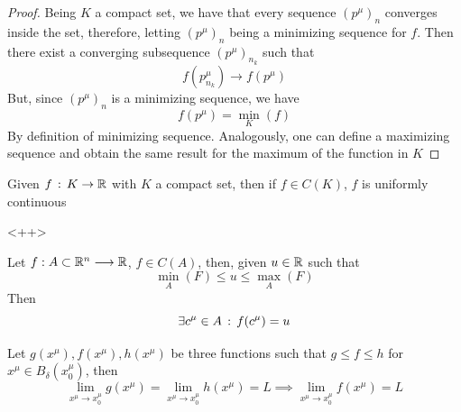 \documentclass[../complete.tex]{subfiles}
\begin{document}
\begin{proof}
	Being $K$ a compact set, we have that every sequence $(p^\mu)_n$ converges inside the set, therefore, letting $(p^\mu)_n$ being a minimizing sequence for $f$. Then there exist a converging subsequence $(p^\mu)_{n_k}$ such that
	\begin{equation*}
		f(p^\mu_{n_k})\to f(p^\mu)
	\end{equation*}
	But, since $(p^\mu)_n$ is a minimizing sequence, we have
	\begin{equation*}
		f(p^\mu)=\min_{K}(f)
	\end{equation*}
	By definition of minimizing sequence. Analogously, one can define a maximizing sequence and obtain the same result for the maximum of the function in $K$
\end{proof}
\begin{thm}
	Given $f\, :\,  K\to\mathbb{R}$ with $K$ a compact set, then if $f\in C(K)$, $f$ is uniformly continuous
\end{thm}<++>
\begin{thm}
	Let $f:A\subset\mathbb{R}^n\overset{}{\longrightarrow}\mathbb{R}$, $f\in C(A)$, then, given $u\in\mathbb{R}$ such that
	\begin{equation*}
		\min_A(F)\le u\le\max_A(F)
	\end{equation*}
	Then
	\begin{equation*}
		\exists c^\mu\in A\, :\,  f(c^\mu)=u
	\end{equation*}
\end{thm}
\begin{thm}[Squeeze]
	Let $g(x^\mu),f(x^\mu),h(x^\mu)$ be three functions such that $g\le f\le h$ for $x^\mu\in B_\delta(x^\mu_0)$, then
	\begin{equation*}
		\lim_{x^\mu\to x_0^\mu}g(x^\mu)=\lim_{x^\mu\to x_0^\mu}h(x^\mu)=L\implies{}\lim_{x^\mu\to x_0^\mu}f(x^\mu)=L
	\end{equation*}
\end{thm}
\end{document}
